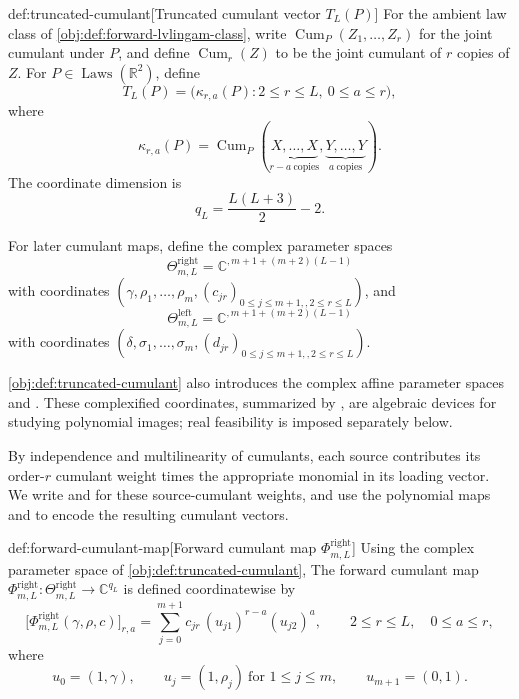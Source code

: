 \documentclass[11pt]{article}
\begin{document}
\begin{definitionv}{def:truncated-cumulant}[Truncated cumulant vector \(T_L(P)\)]
For the ambient law class of \cref{obj:def:forward-lvlingam-class}, write \(\operatorname{Cum}_P(Z_1,\ldots,Z_r)\) for the joint cumulant under \(P\), and define \(\operatorname{Cum}_r(Z)\) to be the joint cumulant of \(r\) copies of \(Z\). For \(P\in \operatorname{Laws}(\mathbb R^2)\), define
\[
T_L(P)=\bigl(\kappa_{r,a}(P):2\le r\le L,\ 0\le a\le r\bigr),
\]
where
\[
\kappa_{r,a}(P)
=
\operatorname{Cum}_P(\underbrace{X,\ldots,X}_{r-a\ \mathrm{copies}},
\underbrace{Y,\ldots,Y}_{a\ \mathrm{copies}}).
\]
The coordinate dimension is
\[
q_L=\frac{L(L+3)}{2}-2.
\]

For later cumulant maps, define the complex parameter spaces
\[
\Theta^{\mathrm{right}}_{m,L}
=\mathbb C^{,m+1+(m+2)(L-1)}
\]
with coordinates \((\gamma,\rho_1,\ldots,\rho_m,(c_{jr})_{0\le j\le m+1,,2\le r\le L})\), and
\[
\Theta^{\mathrm{left}}_{m,L}
=\mathbb C^{,m+1+(m+2)(L-1)}
\]
with coordinates \((\delta,\sigma_1,\ldots,\sigma_m,(d_{jr})_{0\le j\le m+1,,2\le r\le L})\).
\end{definitionv}

\cref{obj:def:truncated-cumulant} also introduces the complex affine parameter spaces  and . These complexified coordinates, summarized by , are algebraic devices for studying polynomial images; real feasibility is imposed separately below.

By independence and multilinearity of cumulants, each source contributes its order-\(r\) cumulant weight times the appropriate monomial in its loading vector. We write  and  for these source-cumulant weights, and use the polynomial maps  and  to encode the resulting cumulant vectors.

\begin{definitionv}{def:forward-cumulant-map}[Forward cumulant map \(\Phi^{\mathrm{right}}_{m,L}\)]
Using the complex parameter space of \cref{obj:def:truncated-cumulant}, The forward cumulant map \(\Phi^{\mathrm{right}}_{m,L}:\Theta^{\mathrm{right}}_{m,L}\to\mathbb C^{q_L}\) is defined coordinatewise by
\[
\bigl[\Phi^{\mathrm{right}}_{m,L}(\gamma,\rho,c)\bigr]_{r,a}
=
\sum_{j=0}^{m+1}
c_{jr}\,(u_{j1})^{r-a}(u_{j2})^a,
\qquad
2\le r\le L,\quad 0\le a\le r,
\]
where
\[
u_0=(1,\gamma),\qquad
u_j=(1,\rho_j)\ \text{for }1\le j\le m,\qquad
u_{m+1}=(0,1).
\]
\end{definitionv}
\end{document}
